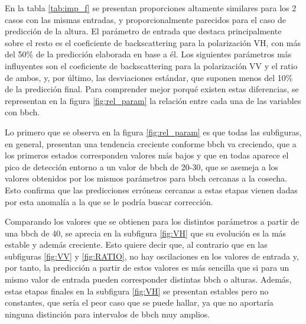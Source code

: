 \par En la tabla \ref{tab:imp_f} se presentan proporciones altamente similares para los 2 casos con las mismas entradas, y proporcionalmente parecidos para el caso de predicción de la altura. El parámetro de entrada que destaca principalmente sobre el resto es el coeficiente de backscattering para la polarización VH, con más del 50\% de la predicción elaborada en base a él. Los siguientes parámetros más influyentes son el coeficiente de backscattering para la polarización VV y el ratio de ambos, y, por último, las desviaciones estándar, que suponen menos del 10\% de la predicción final. Para comprender mejor porqué existen estas diferencias, se representan en la figura \ref{fig:rel_param} la relación entre cada una de las variables con \gls{bbch}.
\\
\par Lo primero que se observa en la figura \ref{fig:rel_param} es que todas las subfiguras, en general, presentan una tendencia creciente conforme \gls{bbch} va creciendo, que a los primeros estados corresponden valores más bajos y que en todas aparece el pico de detección entorno a un valor de \gls{bbch} de 20-30, que se asemeja a los valores obtenidos por los mismos parámetros para \gls{bbch} cercanas a la cosecha. Esto confirma que las predicciones erróneas cercanas a estas etapas vienen dadas por esta anomalía a la que se le podría buscar corrección. 
\\
\par Comparando los valores que se obtienen para los distintos parámetros a partir de una \gls{bbch} de 40, se aprecia en la subfigura \ref{fig:VH} que su evolución es la más estable y además creciente. Esto quiere decir que, al contrario que en las subfiguras \ref{fig:VV} y \ref{fig:RATIO}, no hay oscilaciones en los valores de entrada y, por tanto, la predicción a partir de estos valores es más sencilla que si para un mismo valor de entrada pueden corresponder distintas \gls{bbch} o alturas. Además, estas etapas finales en la subfigura \ref{fig:VH} se presentan estables pero no constantes, que sería el peor caso que se puede hallar, ya que no aportaría ninguna distinción para intervalos de \gls{bbch} muy amplios. 

